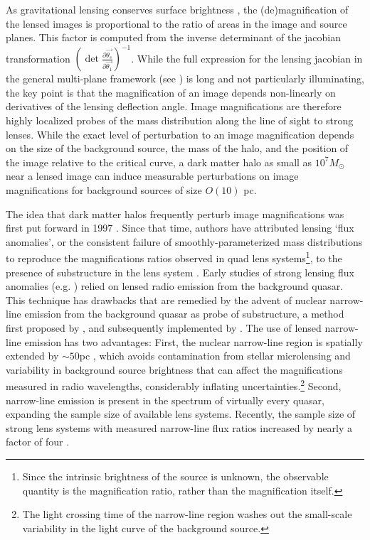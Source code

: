 As gravitational lensing conserves surface brightness \cite{MisnerThorneWheeler}, the (de)magnification of the lensed images is proportional to the ratio of areas in the image and source planes. This factor is computed from the inverse determinant of the jacobian transformation $\left(\det \frac{\partial \vec{\theta_s}}{\partial \vec{\theta_1}}\right)^{-1}$. While the full expression for the lensing jacobian in the general multi-plane framework (see \cite{BlandfordNarayan86}) is long and not particularly illuminating, the key point is that the magnification of an image depends non-linearly on derivatives of the lensing deflection angle. Image magnifications are therefore highly localized probes of the mass distribution along the line of sight to strong lenses. While the exact level of perturbation to an image magnification depends on the size of the background source, the mass of the halo, and the position of the image relative to the critical curve, a dark matter halo as small as $10^7 M_{\odot}$ near a lensed image can induce measurable perturbations on image magnifications for background sources of size $O\left(10\right)$ pc. 

The idea that dark matter halos frequently perturb image magnifications was first put forward in 1997 \cite{MaoSchneider98}. Since that time, authors have attributed lensing `flux anomalies', or the consistent failure of smoothly-parameterized mass distributions to reproduce the magnifications ratios observed in quad lens systems\footnote{Since the intrinsic brightness of the source is unknown, the observable quantity is the magnification ratio, rather than the magnification itself.}, to the presence of substructure in the lens system \cite{Metcalf++02,D+K02,Xu++12,Xu++15}. Early studies of strong lensing flux anomalies (e.g. \cite{D+K02}) relied on lensed radio emission from the background quasar. This technique has drawbacks that are remedied by the advent of nuclear narrow-line emission from the background quasar as probe of substructure, a method first proposed by \cite{MoustakasMetcalf02}, and subsequently implemented by \cite{Sugai++07,Nierenberg++14,Nierenberg++17,Nierenberg++19}. The use of lensed narrow-line emission has two advantages: First, the nuclear narrow-line region is spatially extended by $\sim 50$pc \cite{MullerSanchez++11}, which avoids contamination from stellar microlensing and variability in background source brightness that can affect the magnifications measured in radio wavelengths, considerably inflating uncertainties.\footnote{The light crossing time of the narrow-line region washes out the small-scale variability in the light curve of the background source.} Second, narrow-line emission is present in the spectrum of virtually every quasar, expanding the sample size of available lens systems. Recently, the sample size of strong lens systems with measured narrow-line flux ratios increased by nearly a factor of four \cite{Nierenberg++19}. 

